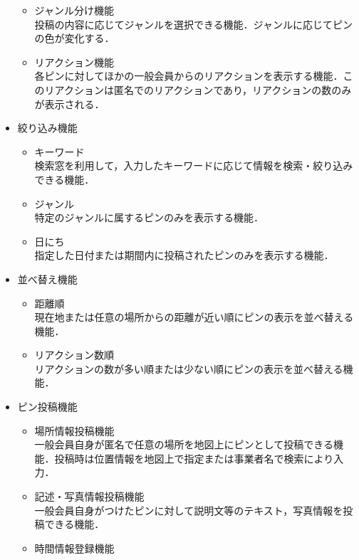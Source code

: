 \begin{itemize}[itemsep=10pt]
\begin{itemize}[itemsep=10pt]
        \item ジャンル分け機能 \mbox{}\\
        投稿の内容に応じてジャンルを選択できる機能．ジャンルに応じてピンの色が変化する．
        \item  リアクション機能 \mbox{}\\
        各ピンに対してほかの一般会員からのリアクションを表示する機能．このリアクションは匿名でのリアクションであり，リアクションの数のみが表示される．
    \end{itemize}
    \item 絞り込み機能
    \begin{itemize}[itemsep=10pt]
        \item キーワード \mbox{} \\
        検索窓を利用して，入力したキーワードに応じて情報を検索・絞り込みできる機能．
        \item ジャンル \mbox{}\\
        特定のジャンルに属するピンのみを表示する機能．
        \item 日にち \mbox{}\\
        指定した日付または期間内に投稿されたピンのみを表示する機能．
    \end{itemize}
    \item 並べ替え機能
    \begin{itemize}[itemsep=10pt]
        \item 距離順 \mbox{} \\
        現在地または任意の場所からの距離が近い順にピンの表示を並べ替える機能．
        \item リアクション数順 \mbox{} \\
        リアクションの数が多い順または少ない順にピンの表示を並べ替える機能．
    \end{itemize}
    \item ピン投稿機能
    \begin{itemize}[itemsep=10pt]
        \item 場所情報投稿機能 \mbox{}\\
        一般会員自身が匿名で任意の場所を地図上にピンとして投稿できる機能．投稿時は位置情報を地図上で指定または事業者名で検索により入力．
        \item 記述・写真情報投稿機能 \mbox{}\\
        一般会員自身がつけたピンに対して説明文等のテキスト，写真情報を投稿できる機能．
        \item 時間情報登録機能 \mbox{}\\

\end{itemize}
\end{itemize}
